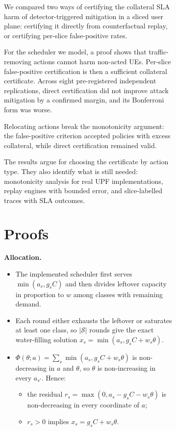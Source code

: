 \begin{figure}[!t]
{\begin{figure}[!t]
{We compared two ways of certifying the collateral SLA harm of
detector-triggered mitigation in a sliced user plane: certifying it
directly from counterfactual replay, or certifying per-slice
false-positive rates.

For the scheduler we model, a proof shows that traffic-removing actions
cannot harm non-acted UEs. Per-slice false-positive certification is
then a sufficient collateral certificate. Across eight pre-registered
independent replications, direct certification did not improve attack
mitigation by a confirmed margin, and its Bonferroni form was worse.

Relocating actions break the monotonicity argument: the false-positive
criterion accepted policies with excess collateral, while direct
certification remained valid.

The results argue for choosing the certificate by action type. They also
identify what is still needed: monotonicity analysis for real UPF
implementations, replay engines with bounded error, and slice-labelled
traces with SLA outcomes.

\hypertarget{app:proof}{%
\appendices
\section{Proofs}\label{app:proof}}

\textbf{Allocation.}

\begin{itemize}
\tightlist
\item
  The implemented scheduler first serves \(\min(a_s,g_sC)\) and then
  divides leftover capacity in proportion to \(w\) among classes with
  remaining demand.
\item
  Each round either exhausts the leftover or saturates at least one
  class, so \(|\mathcal{S}|\) rounds give the exact water-filling
  solution \(x_s=\min(a_s,g_sC+w_s\theta)\).
\item
  \(\Phi(\theta;a)=\sum_s\min(a_s,g_sC+w_s\theta)\) is non-decreasing in
  \(a\) and \(\theta\), so \(\theta\) is non-increasing in every
  \(a_{s'}\). Hence:

  \begin{itemize}
  \tightlist
  \item
    the residual \(r_s=\max(0,a_s-g_sC-w_s\theta)\) is non-decreasing in
    every coordinate of \(a\);
  \item
    \(r_s>0\) implies \(x_s=g_sC+w_s\theta\).
  \end{itemize}
\end{itemize}

}
\end{figure}}
\end{figure}
